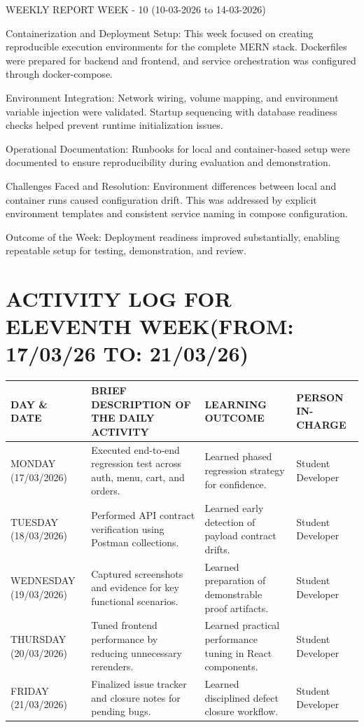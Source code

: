 \documentclass[12pt,a4paper]{report}
\begin{document}
WEEKLY REPORT
WEEK - 10 (10-03-2026 to 14-03-2026)

Containerization and Deployment Setup:
This week focused on creating reproducible execution environments for the complete MERN stack. Dockerfiles were prepared for backend and frontend, and service orchestration was configured through docker-compose.

Environment Integration:
Network wiring, volume mapping, and environment variable injection were validated. Startup sequencing with database readiness checks helped prevent runtime initialization issues.

Operational Documentation:
Runbooks for local and container-based setup were documented to ensure reproducibility during evaluation and demonstration.

Challenges Faced and Resolution:
Environment differences between local and container runs caused configuration drift. This was addressed by explicit environment templates and consistent service naming in compose configuration.

Outcome of the Week:
Deployment readiness improved substantially, enabling repeatable setup for testing, demonstration, and review.

\section*{ACTIVITY LOG FOR ELEVENTH WEEK(FROM: 17/03/26 TO: 21/03/26)}
\begin{longtable}{|p{2.2cm}|p{5.2cm}|p{4.3cm}|p{3.2cm}|}
\hline
\textbf{DAY \& DATE} & \textbf{BRIEF DESCRIPTION OF THE DAILY ACTIVITY} & \textbf{LEARNING OUTCOME} & \textbf{PERSON IN- CHARGE} \\
\hline
MONDAY (17/03/2026) & Executed end-to-end regression test across auth, menu, cart, and orders. & Learned phased regression strategy for confidence. & Student Developer \\
\hline
TUESDAY (18/03/2026) & Performed API contract verification using Postman collections. & Learned early detection of payload contract drifts. & Student Developer \\
\hline
WEDNESDAY (19/03/2026) & Captured screenshots and evidence for key functional scenarios. & Learned preparation of demonstrable proof artifacts. & Student Developer \\
\hline
THURSDAY (20/03/2026) & Tuned frontend performance by reducing unnecessary rerenders. & Learned practical performance tuning in React components. & Student Developer \\
\hline
FRIDAY (21/03/2026) & Finalized issue tracker and closure notes for pending bugs. & Learned disciplined defect closure workflow. & Student Developer \\
\hline
\end{longtable}
\end{document}
